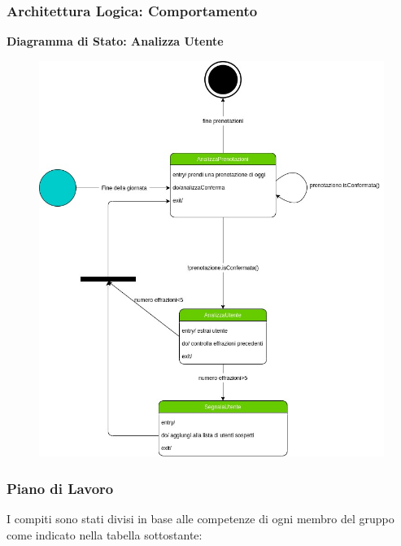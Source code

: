 \newpage
\subsubsection{Architettura Logica: Comportamento}
\hfill \break

\textbf{Diagramma di Stato: Analizza Utente}

\begin{figure}[h!]
    \begin{center}
        \includegraphics[scale=0.5]{immagini/Comportamento.jpg}
    \end{center}
\end{figure}
\hfill \break

\newpage
\subsubsection{Piano di Lavoro}

I compiti sono stati divisi in base alle competenze di 
ogni membro del gruppo come indicato nella tabella sottostante:\\

